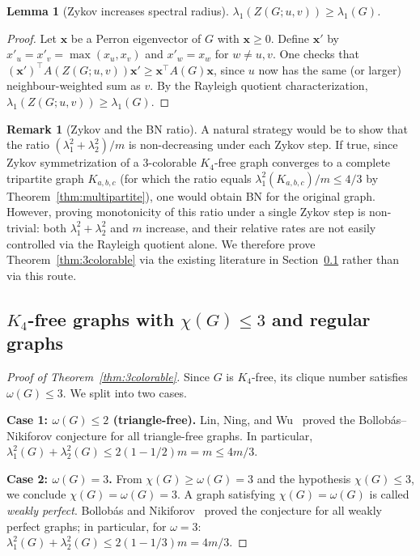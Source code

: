 \documentclass[preprint,12pt]{elsarticle}
\theoremstyle{plain}
\newtheorem{lemma}[theorem]{Lemma}
\theoremstyle{definition}
\newtheorem{remark}[theorem]{Remark}
\begin{document}
\begin{lemma}[Zykov increases spectral radius]
  \label{lem:zykov-lambda1}
  $\lambda_1(Z(G;u,v)) \geq \lambda_1(G)$.
\end{lemma}

\begin{proof}
Let $\mathbf{x}$ be a Perron eigenvector of $G$ with $\mathbf{x} \geq 0$.
Define $\mathbf{x}'$ by $x'_u = x'_v = \max(x_u, x_v)$ and $x'_w = x_w$
for $w \neq u, v$.
One checks that
$(\mathbf{x}')^\top A(Z(G;u,v)) \mathbf{x}' \geq \mathbf{x}^\top A(G)\mathbf{x}$,
since $u$ now has the same (or larger) neighbour-weighted sum as $v$.
By the Rayleigh quotient characterization,
$\lambda_1(Z(G;u,v)) \geq \lambda_1(G)$.
\end{proof}

\begin{remark}[Zykov and the BN ratio]
  \label{rem:zykov-ratio}
  A natural strategy would be to show that the ratio
  $(\lambda_1^2 + \lambda_2^2)/m$ is non-decreasing under each Zykov step.
  If true, since Zykov symmetrization of a $3$-colorable $K_4$-free graph
  converges to a complete tripartite graph $K_{a,b,c}$ (for which the ratio
  equals $\lambda_1^2(K_{a,b,c})/m \leq 4/3$ by
  Theorem~\ref{thm:multipartite}), one would obtain BN for the original
  graph.
  However, proving monotonicity of this ratio under a single Zykov step is
  non-trivial: both $\lambda_1^2 + \lambda_2^2$ and $m$ increase, and their
  relative rates are not easily controlled via the Rayleigh quotient alone.
  We therefore prove Theorem~\ref{thm:3colorable} via the existing
  literature in Section~\ref{ssec:3colorable} rather than via this route.
\end{remark}

\subsection{$K_4$-free graphs with $\chi(G) \leq 3$ and regular graphs}
\label{ssec:3colorable}

\begin{proof}[Proof of Theorem~\ref{thm:3colorable}]
Since $G$ is $K_4$-free, its clique number satisfies $\omega(G) \leq 3$.
We split into two cases.

\textbf{Case 1: $\omega(G) \leq 2$ (triangle-free).}
Lin, Ning, and Wu~\cite{LinNingWu2021} proved the Bollob\'as--Nikiforov
conjecture for all triangle-free graphs.  In particular,
$\lambda_1^2(G) + \lambda_2^2(G) \leq 2(1-1/2)m = m \leq 4m/3$.

\textbf{Case 2: $\omega(G) = 3$.}
From $\chi(G) \geq \omega(G) = 3$ and the hypothesis $\chi(G) \leq 3$,
we conclude $\chi(G) = \omega(G) = 3$.  A graph satisfying $\chi(G) =
\omega(G)$ is called \emph{weakly perfect}.  Bollob\'as and
Nikiforov~\cite{BollobasNikiforov2007} proved the conjecture for all
weakly perfect graphs; in particular, for $\omega = 3$:
$\lambda_1^2(G) + \lambda_2^2(G) \leq 2(1-1/3)m = 4m/3$.
\end{proof}
\end{document}
